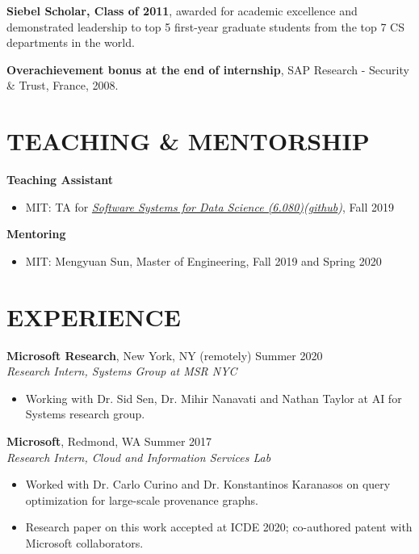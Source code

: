 \documentclass[line,margin]{res}
\begin{document}
\begin{resume}
\textbf{Siebel Scholar, Class of 2011}, awarded for academic excellence and demonstrated leadership to top 5 first-year graduate students from the top 7 CS departments in the world.

\textbf{Overachievement bonus at the end of internship}, SAP Research - Security \& Trust, France, 2008.




\section{TEACHING \& MENTORSHIP}
  \textbf{Teaching Assistant} \\
  \begin{itemize}
    \item MIT: TA for {\sl \href{http://dsg.csail.mit.edu/6.S080/}{Software Systems for Data Science (6.080)}(\href{https://github.com/mitdbg/datascienceclass}{github})}, Fall 2019
  \end{itemize}

  \textbf{Mentoring} \\
  \begin{itemize}
    \item MIT: Mengyuan Sun, Master of Engineering, Fall 2019 and Spring 2020
  \end{itemize}

\section{EXPERIENCE}
\textbf{Microsoft Research}, New York, NY (remotely) \hfill Summer 2020 \\
  {\sl Research Intern, Systems Group at MSR NYC}
  \begin{itemize}
  \item Working with Dr. Sid Sen, Dr. Mihir Nanavati and Nathan Taylor at AI for Systems research group.
  \end{itemize}

  \textbf{Microsoft}, Redmond, WA \hfill Summer 2017 \\
  {\sl Research Intern, Cloud and Information Services Lab}
  \begin{itemize}
  \item Worked with Dr. Carlo Curino and Dr. Konstantinos Karanasos on query optimization for large-scale provenance graphs.
  \item Research paper on this work accepted at ICDE 2020; co-authored patent with Microsoft collaborators.
  \end{itemize}


\end{resume}
\end{document}
